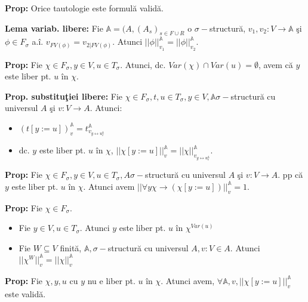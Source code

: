 \documentclass{article}
\begin{document}
\textbf{Prop:} Orice tautologie este formul\u a valid\u a.

\textbf{Lema variab. libere:} Fie $\mathbb A=(A,(A_s)_{s\in F\cup R}$ o $\sigma-$structur\u a, $v_1,v_2:V\rightarrow\mathbb A$ \c si $\phi\in F_\sigma$ a.\^ i. $v_{FV(\phi)}=v_{2|FV(\phi)}$. Atunci $||\phi||_{v_1}^{\mathbb A}=||\phi||_{v_2}^{\mathbb A}$.

\textbf{Prop:} Fie $\chi\in F_\sigma, y\in V,u\in T_\sigma$. Atunci, dc. $Var(\chi)\cap Var(u)=\emptyset$, avem c\u a $y$ este liber pt. $u$ \^ in $\chi$.

\textbf{Prop. substitu\c tiei libere:} Fie $\chi\in F_\sigma, t,u\in T_\sigma,y\in V, \mathbb A \sigma-$structur\u a cu universul $A$ \c si $v:V\rightarrow A$. Atunci:
\begin{itemize}
    \item $(t[y:=u])_v^{\mathbb A}=t_{v_{y\leftrightarrow u_v^{\mathbb A}}}^{\mathbb A}$
    \item dc. $y$ este liber pt. $u$ \^ in $\chi$, $||\chi[y:=u]||_v^{\mathbb A}=||\chi||_{v_{y\leftrightarrow u_v^{\mathbb A}}}^{\mathbb A}$.
\end{itemize}

\textbf{Prop:} Fie $\chi\in F_\sigma,y\in V,u\in T_\sigma, A \sigma-$structur\u a cu universul $A$ \c si $v:V\rightarrow A$. pp c\u a $y$ este liber pt. $u$ \^ in $\chi$. Atunci avem $||\forall y\chi\rightarrow (\chi[y:=u])||_{v}^{\mathbb A}=1$.

\textbf{Prop:} Fie $\chi \in F_\sigma$.
\begin{itemize}
    \item Fie $y\in V,u\in T_\sigma$. Atunci $y$ este liber pt. $u$ \^ in $\chi^{Var(u)}$
    \item Fie $W\subseteq V$ finit\u a, $\mathbb A, \sigma-$structur\u a cu universul $A,v:V\in A$. Atunci $||\chi^W||_v^{\mathbb A}=||\chi||_v^{\mathbb A}$
\end{itemize}

\textbf{Prop:} Fie $\chi,y,u$ cu $y$ nu e liber pt. $u$ \^ in $\chi$. Atunci avem, $\forall \mathbb A,v,||\chi[y:=u]||_v^{\mathbb A}$ este valid\u a.
\end{document}
